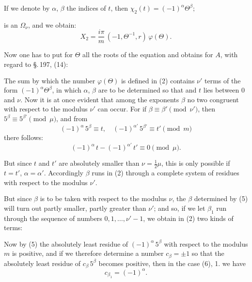 
If we denote by $\alpha$, $\beta$ the indices of $t$, then $\chi_2(t) = (-1)^\alpha\Theta^\beta;$


is an  $\Omega_\nu$, and we obtain:
\[
X_2 = \frac{i\pi}{m}\,(-1,\Theta^{-1},r)\,\varphi(\Theta).
\]

Now one has to put for $\Theta$ all the roots of the equation
and obtains for $A$, with regard to \S.\,197, (14):

The sum by which the number $\varphi(\Theta)$ is defined in (2)
contains $\nu'$ terms of the form $(-1)^\alpha\Theta^\beta$, in which $\alpha$, $\beta$ are to be
determined so that
and $t$ lies between 0 and $\nu$. Now it is at once evident that
among the exponents $\beta$ no two congruent with respect to the modulus $\nu'$ can occur. For if $\beta \equiv \beta' \pmod{\nu'}$, then
$5^\beta \equiv 5^{\beta'} \pmod{\mu}$, and from
\[
(-1)^\alpha\,5^\beta \equiv t, \quad (-1)^{\alpha'}\,5^{\beta'} \equiv t' \pmod{m}
\]
there follows:
\[
(-1)^\alpha\,t - (-1)^{\alpha'}\,t' \equiv 0 \pmod{\mu}.
\]

But since $t$ and $t'$ are absolutely smaller than $\nu = \tfrac{1}{2}\mu$, this
is only possible if $t = t'$, $\alpha = \alpha'$. Accordingly
$\beta$ runs in (2) through a complete system of residues with respect to the modulus $\nu'$.

But since $\beta$ is to be taken with respect to the modulus $\nu$, the
$\beta$ determined by (5) will turn out partly smaller, partly greater than $\nu'$; and so, if we let $\beta_1$ run through the sequence of numbers $0, 1, \dots, \nu' - 1$,
we obtain in (2) two kinds of
terms:

Now by (5) the absolutely least residue of $(-1)^\alpha\,5^\beta$
with respect to the modulus $m$ is positive, and if we therefore determine a number
$c_\beta = \pm 1$ so that the absolutely least residue of $c_\beta\,5^\beta$
becomes positive, then in the case (6), 1. we have
\[
c_{\beta_1} = (-1)^\alpha.
\]
